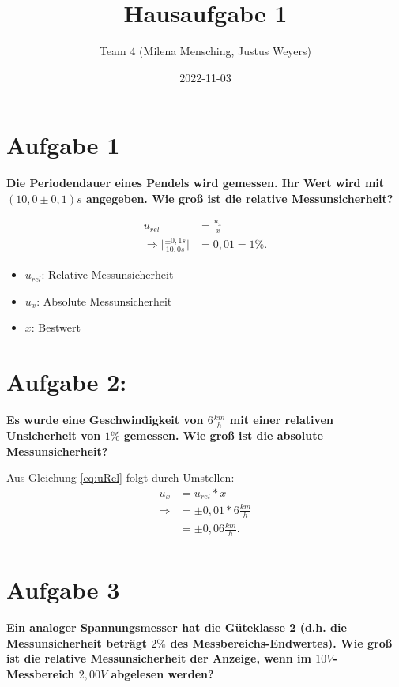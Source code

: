 \documentclass[
]{article}
\title{Hausaufgabe 1}
\author{Team 4 (Milena Mensching, Justus Weyers)}
\date{2022-11-03}
\begin{document}
\maketitle

\hypertarget{aufgabe-1}{%
\section{Aufgabe 1}\label{aufgabe-1}}
\textbf{Die Periodendauer eines Pendels wird gemessen. 
Ihr Wert wird mit \((10,0 \pm 0,1)s\) angegeben. 
Wie groß ist die relative Messunsicherheit?}

\begin{equation}\label{eq:uRel}
  \begin{split}
    u_{rel} &= \frac{u_x}{x} \\
    \Rightarrow \vert\frac{\pm0,1s}{10,0s}\vert & = 0,01 = 1\%.
  \end{split}
\end{equation}

\begin{itemize}
  \item  $u_{rel}$: Relative Messunsicherheit
  \item  $u_x$: Absolute Messunsicherheit
  \item  $x$: Bestwert
\end{itemize}

\hypertarget{aufgabe-2}{%
\section{Aufgabe 2:}\label{aufgabe-2}}

\textbf{Es wurde eine Geschwindigkeit von \(6 \frac{km}{h}\) mit einer relativen Unsicherheit von \(1 \%\) gemessen. 
Wie groß ist die absolute Messunsicherheit?}

Aus Gleichung \ref{eq:uRel} folgt durch Umstellen:
\begin{equation}\label{eq:uAbs}
  \begin{split}
  	u_x &= u_{rel}*x \\
    \Rightarrow & = \pm 0,01 * 6 \frac{km}{h}\\
    &= \pm 0,06 \frac{km}{h}.\\
  \end{split}
\end{equation}

\hypertarget{aufgabe-3}{%
\section{Aufgabe 3}\label{aufgabe-3}}
\textbf{Ein analoger Spannungsmesser hat die Güteklasse 2 (d.h. die Messunsicherheit beträgt \(2 \%\) des Messbereichs-Endwertes). 
Wie groß ist die relative Messunsicherheit der Anzeige, wenn im \(10 V\)-Messbereich \(2,00 V\) abgelesen werden?}
\end{document}
